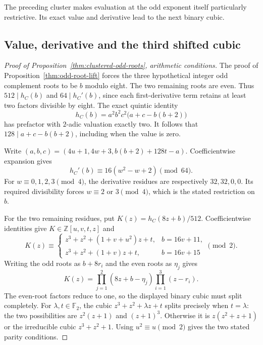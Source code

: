 The preceding cluster makes evaluation at the odd exponent itself
particularly restrictive. Its exact value and derivative lead to the next
binary cubic.

\subsection{Value, derivative and the third shifted cubic}

\begin{proof}[Proof of Proposition~\ref{thm:clustered-odd-roots}, arithmetic conditions]
The proof of Proposition~\ref{thm:odd-root-lift} forces the three hypothetical
integer odd complement roots to be $b$ modulo eight. The two remaining
roots are even. Thus $512\mid h_C(b)$ and $64\mid h_C'(b)$, since each
first-derivative term retains at least two factors divisible by eight.
The exact quintic identity
\[
 h_C(b)=a^2b^2c^2\bigl(a+c-b(b+2)\bigr)
\]
has prefactor with $2$-adic valuation exactly two. It follows that
$128\mid a+c-b(b+2)$, including when the value is zero.

Write $(a,b,c)=(4u+1,4w+3,b(b+2)+128t-a)$.
Coefficientwise expansion gives
\[
 h_C'(b)\equiv16(w^2-w+2)\pmod{64}.
\]
For $w\equiv0,1,2,3\pmod4$, the derivative residues are respectively
$32,32,0,0$. Its required divisibility forces $w\equiv2$ or $3\pmod4$,
which is the stated restriction on $b$.

For the two remaining residues, put $K(z)=h_C(8z+b)/512$.
Coefficientwise identities give $K\in\mathbb Z[u,v,t,z]$ and
\[
 K(z)\equiv
 \begin{cases}
 z^3+z^2+(1+v+u^2)z+t,&b=16v+11,\\
 z^3+z^2+(1+v)z+t,&b=16v+15
 \end{cases}\pmod2.
\]
Writing the odd roots as $b+8r_i$ and the even roots as $\eta_j$ gives
\[
 K(z)=\prod_{j=1}^2(8z+b-\eta_j)\prod_{i=1}^3(z-r_i).
\]
The even-root factors reduce to one, so the displayed binary cubic must
split completely. For $\lambda,t\in\mathbb F_2$, the cubic
$z^3+z^2+\lambda z+t$ splits precisely when $t=\lambda$: the two
possibilities are $z^2(z+1)$ and $(z+1)^3$. Otherwise it is
$z(z^2+z+1)$ or the irreducible cubic $z^3+z^2+1$.
Using $u^2\equiv u\pmod2$ gives the two stated parity conditions.
\end{proof}
